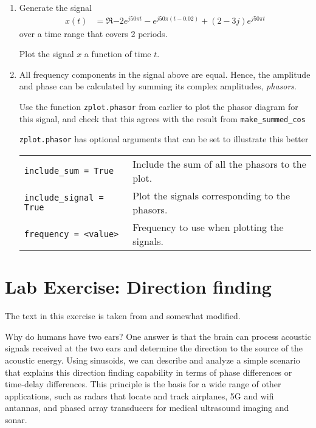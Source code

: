 \begin{enumerate}[1)]
\item Generate the signal
	\begin{align*}
		x(t) &= \Re{-2e^{j50\pi t} - e^{j50\pi(t-0.02)} +(2-3j)e^{j50\pi t}   } 
	\end{align*}
	over a time range that covers 2 periods. 
	
	Plot the signal $x$ a function of time $t$.
	
	\item All frequency components in the signal above are equal. Hence, the amplitude and phase can be calculated by summing its complex amplitudes, \emph{phasors}.
	
	Use the function \verb|zplot.phasor| from earlier to plot the phasor diagram for this signal, and check that this agrees with the result from \verb|make_summed_cos|
	
	\verb|zplot.phasor| has optional arguments that can be set to illustrate this better
	
	\begin{tabular}{ll}
		\verb|include_sum = True| & Include the sum of all the phasors to the plot. \\
		\verb|include_signal = True| & Plot the signals corresponding to the phasors. \\
		\verb|frequency = <value>|  & Frequency to use when plotting the signals.
		
	\end{tabular}

\end{enumerate}



\section{Lab Exercise: Direction finding}
The text in this exercise is taken from \cite{mcclellan_lab_2016} and somewhat modified.

Why do humans have two ears? One answer is that the brain can process acoustic signals received at the two ears and determine the direction to the source of the acoustic energy. Using sinusoids, we can describe and analyze a simple scenario that explains this direction finding capability in terms of phase differences or time-delay differences. 
This principle is the basis for a wide range of other applications, such as  radars that locate and track airplanes, 5G and wifi antannas, and phased array transducers for medical ultrasound imaging and sonar.

